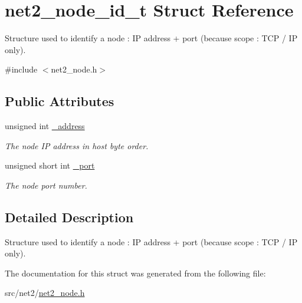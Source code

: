 \hypertarget{structnet2__node__id__t}{}\section{net2\+\_\+node\+\_\+id\+\_\+t Struct Reference}
\label{structnet2__node__id__t}


Structure used to identify a node \+: I\+P address + port (because scope \+: T\+C\+P / I\+P only).  




{\ttfamily \#include $<$net2\+\_\+node.\+h$>$}

\subsection*{Public Attributes}
\begin{DoxyCompactItemize}
\item 
\hypertarget{structnet2__node__id__t_a99c44d35c43abc24127fcee951ae1283}{}unsigned int \hyperlink{structnet2__node__id__t_a99c44d35c43abc24127fcee951ae1283}{\+\_\+address}\label{structnet2__node__id__t_a99c44d35c43abc24127fcee951ae1283}

\begin{DoxyCompactList}\small\item\em The node I\+P address in host byte order. \end{DoxyCompactList}\item 
\hypertarget{structnet2__node__id__t_a4ddc08171c72d7ad6650bc9ecbf08c34}{}unsigned short int \hyperlink{structnet2__node__id__t_a4ddc08171c72d7ad6650bc9ecbf08c34}{\+\_\+port}\label{structnet2__node__id__t_a4ddc08171c72d7ad6650bc9ecbf08c34}

\begin{DoxyCompactList}\small\item\em The node port number. \end{DoxyCompactList}\end{DoxyCompactItemize}


\subsection{Detailed Description}
Structure used to identify a node \+: I\+P address + port (because scope \+: T\+C\+P / I\+P only). 

The documentation for this struct was generated from the following file\+:\begin{DoxyCompactItemize}
\item 
src/net2/\hyperlink{net2__node_8h}{net2\+\_\+node.\+h}\end{DoxyCompactItemize}
